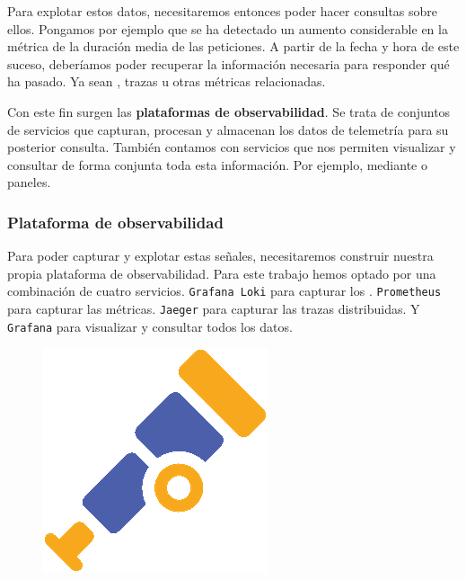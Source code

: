 Para explotar estos datos, necesitaremos entonces poder hacer consultas sobre ellos. Pongamos por ejemplo que se ha detectado un aumento considerable en la métrica de la duración media de las peticiones. A partir de la fecha y hora de este suceso, deberíamos poder recuperar la información necesaria para responder qué ha pasado. Ya sean , trazas u otras métricas relacionadas.

Con este fin surgen las \textbf{plataformas de observabilidad}. Se trata de conjuntos de servicios que capturan, procesan y almacenan los datos de telemetría para su posterior consulta. \cite{zorrillacastroNETCoreApps2021} También contamos con servicios que nos permiten visualizar y consultar de forma conjunta toda esta información. Por ejemplo, mediante  o paneles.

\subsubsection{Plataforma de observabilidad}

Para poder capturar y explotar estas señales, necesitaremos construir nuestra propia plataforma de observabilidad. Para este trabajo hemos optado por una combinación de cuatro servicios. \texttt{Grafana Loki} para capturar los . \texttt{Prometheus} para capturar las métricas. \texttt{Jaeger} para capturar las trazas distribuidas. Y \texttt{Grafana} para visualizar y consultar todos los datos.

\begin{figure}
  \vspace{-10pt}
  \hspace{10pt}
  \centering
  \includegraphics[scale=0.5]{cap_despliegue/images/opentelemetry-logo}
\end{figure}

